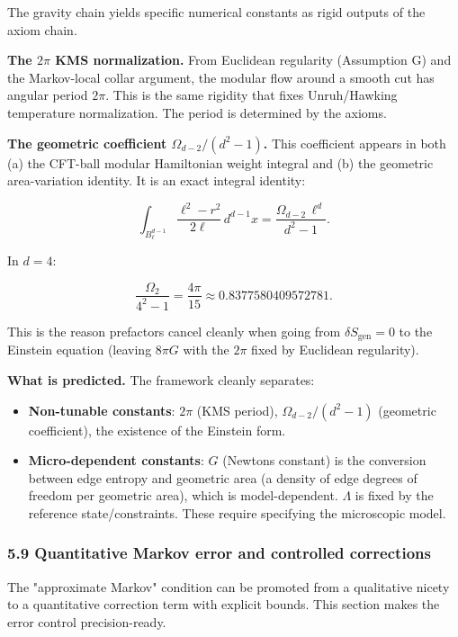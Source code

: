 The gravity chain yields specific numerical constants as rigid outputs of the axiom chain.

\textbf{The \(2\pi\) KMS normalization.} From Euclidean regularity (Assumption G) and the Markov-local collar argument, the modular flow around a smooth cut has angular period \(2\pi\). This is the same rigidity that fixes Unruh/Hawking temperature normalization. The period is determined by the axioms.

\textbf{The geometric coefficient \(\Omega_{d-2}/(d^2 - 1)\).} This coefficient appears in both (a) the CFT-ball modular Hamiltonian weight integral and (b) the geometric area-variation identity. It is an exact integral identity:

\[
\int_{B^{d-1}_\ell} \frac{\ell^2 - r^2}{2\ell} \, d^{d-1}x
= \frac{\Omega_{d-2} \, \ell^d}{d^2 - 1}.
\]

In \(d = 4\):

\[
\frac{\Omega_2}{4^2 - 1} = \frac{4\pi}{15} \approx 0.8377580409572781.
\]

This is the reason prefactors cancel cleanly when going from \(\delta S_{\mathrm{gen}} = 0\) to the Einstein equation (leaving \(8\pi G\) with the \(2\pi\) fixed by Euclidean regularity).

\textbf{What is predicted.} The framework cleanly separates:

\begin{itemize}
\tightlist
\item
  \textbf{Non-tunable constants}: \(2\pi\) (KMS period), \(\Omega_{d-2}/(d^2-1)\) (geometric coefficient), the existence of the Einstein form.
\item
  \textbf{Micro-dependent constants}: \(G\) (Newton\textquotesingle s constant) is the conversion between edge entropy and geometric area (a density of edge degrees of freedom per geometric area), which is model-dependent. \(\Lambda\) is fixed by the reference state/constraints. These require specifying the microscopic model.
\end{itemize}

\subsubsection{5.9 Quantitative Markov error and controlled corrections}\label{59-quantitative-markov-error-and-controlled-corrections}

The "approximate Markov" condition can be promoted from a qualitative nicety to a quantitative correction term with explicit bounds. This section makes the error control precision-ready.

